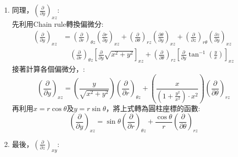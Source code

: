 \documentclass[../main.tex]{subfiles}
\begin{document}
\begin{itemize}
\begin{itemize}
\begin{enumerate}
\begin{align}
            &= \left(\frac{r\cos\theta}{r}\right)\left(\frac{\partial}{\partial r}\right)_{\theta z}
            + \left(-\frac{r\sin\theta}{r^2}\right)\left(\frac{\partial}{\partial \theta}\right)_{rz} \nonumber\\
            &= \cos\theta \left(\frac{\partial}{\partial r}\right)_{\theta z}
            - \frac{\sin\theta}{r}\left(\frac{\partial}{\partial \theta}\right)_{rz}
          \end{align}
          \item 同理，$\left(\frac{\partial}{\partial y}\right)_{xz}$:\\
          先利用Chain rule轉換偏微分:
          \begin{align}
            \left(\frac{\partial}{\partial y}\right)_{xz} &=
            \left(\frac{\partial}{\partial r}\right)_{\theta z}\left(\frac{\partial r}{\partial y}\right)_{xz}
            + \left(\frac{\partial}{\partial \theta}\right)_{rz}\left(\frac{\partial \theta}{\partial y}\right)_{xz}
            + \left(\frac{\partial}{\partial z}\right)_{r\theta}\left(\frac{\partial z}{\partial y}\right)_{xz} \nonumber\\
            &\quad \left(\frac{\partial}{\partial r}\right)_{\theta z}\left[\frac{\partial }{\partial y}\sqrt{x^2 + y^2}\right]_{xz}
            + \left(\frac{\partial}{\partial \theta}\right)_{rz}\left[\frac{\partial }{\partial y}\tan^{-1}\left(\frac{y}{x}\right)\right]_{xz}
          \end{align}
          接著計算各個偏微分，:
          \begin{equation}
            \left(\frac{\partial}{\partial y}\right)_{xz}  =
            \left(\frac{y}{\sqrt{x^2+y^2}}\right)\left(\frac{\partial}{\partial r}\right)_{\theta z}
            + \left(\frac{x}{\left(1+ \frac{y^2}{x^2}\right)\cdot x^2}\right)\left(\frac{\partial}{\partial \theta}\right)_{rz}
          \end{equation}
          再利用$x = r\cos\theta$及$y = r\sin\theta$，將上式轉為圓柱座標的函數:
          \begin{equation}
            \left(\frac{\partial}{\partial y}\right)_{xz}  =
            \sin\theta \left(\frac{\partial}{\partial r}\right)_{\theta z}
            + \frac{\cos\theta}{r}\left(\frac{\partial}{\partial \theta}\right)_{rz}
          \end{equation}
          \item 最後，$\left(\frac{\partial}{\partial z}\right)_{xy}$:
          \begin{equation}

\end{equation}
\end{enumerate}
\end{itemize}
\end{itemize}
\end{document}
